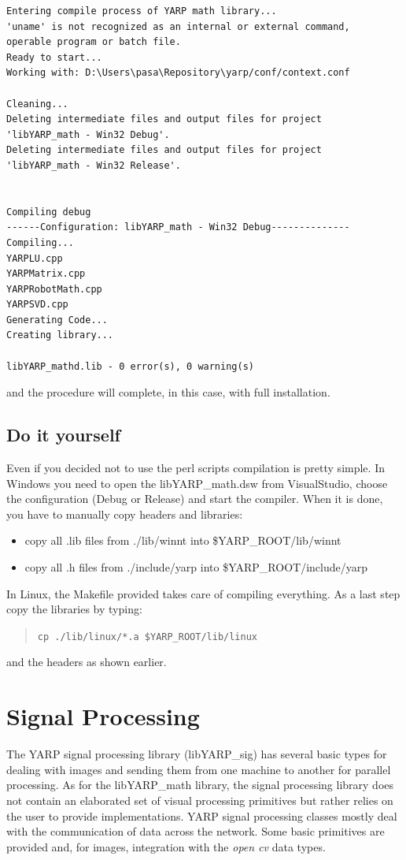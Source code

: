 \begin{verbatim}
Entering compile process of YARP math library...
'uname' is not recognized as an internal or external command,
operable program or batch file.
Ready to start...
Working with: D:\Users\pasa\Repository\yarp/conf/context.conf

Cleaning...
Deleting intermediate files and output files for project 
'libYARP_math - Win32 Debug'.
Deleting intermediate files and output files for project 
'libYARP_math - Win32 Release'.


Compiling debug
------Configuration: libYARP_math - Win32 Debug--------------
Compiling...
YARPLU.cpp
YARPMatrix.cpp
YARPRobotMath.cpp
YARPSVD.cpp
Generating Code...
Creating library...

libYARP_mathd.lib - 0 error(s), 0 warning(s)
\end{verbatim}

\noindent and the procedure will complete, in this case, with full installation.


\subsection{Do it yourself}
Even if you decided not to use the perl scripts compilation is pretty simple. In Windows you need to open the libYARP\_math.dsw from VisualStudio, choose the configuration (Debug or Release) and start the compiler. When it is done, you have to manually copy headers and libraries:
\begin{itemize}
\item copy all .lib files from ./lib/winnt into \$YARP\_ROOT/lib/winnt
\item copy all .h files from ./include/yarp into \$YARP\_ROOT/include/yarp
\end{itemize}

In Linux, the Makefile provided takes care of compiling everything. As a last step copy the libraries by typing:
\begin{quote}
{\tt cp ./lib/linux/*.a \$YARP\_ROOT/lib/linux}
\end{quote}

\noindent and the headers as shown earlier. 



\section{Signal Processing}
The YARP signal processing library (libYARP\_sig) has several basic types for dealing with images and sending them from one machine to another for parallel processing. As for the libYARP\_math library, the signal processing library does not contain an elaborated set of visual processing primitives but rather relies on the user to provide implementations. YARP signal processing classes mostly deal with the communication of data across the network. Some basic primitives are provided and, for images, integration with the {\em open cv} data types.

